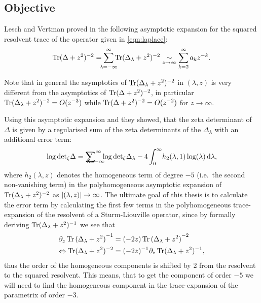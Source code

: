 \subsection{Objective}
Lesch and Vertman proved in \cite{LV13} the following asymptotic expansion for
the squared resolvent trace of the operator given in \cref{eqn:laplace}:
\begin{align}
  \Tr(\Delta + z^2)^{-2} = \sum_{\mathclap{\lambda=-\infty}}^\infty
  \Tr(\Delta_\lambda + z^2)^{-2} \SimAs{z\to\infty} \sum_{k=2}^{\infty}
  a_kz^{-k}.
\end{align}
\begin{Remark}
  Note that in general the asymptotics of $\operatorname{Tr}(\Delta_\lambda + z^2)^{-2}$ in
  $(\lambda,z)$ is very different from the asymptotics of $\operatorname{Tr}(\Delta +
  z^2)^{-2}$, in particular $\operatorname{Tr}(\Delta_\lambda+z^2)^{-2} = O(z^{-3})$ while
  $\operatorname{Tr}(\Delta + z^2)^{-2} = O(z^{-2})$ for $z\to\infty$.
\end{Remark}
Using this asymptotic expansion and  they showed, that the
zeta determinant of $\Delta$ is given by a regularised sum of the
zeta determinants of the $\Delta_\lambda$ with an additional error term:
\begin{align}
  \label{eqn:central-thm}
  \log\zdet\Delta = \Regsum_{\mathclap{\lambda=-\infty}}^\infty
  \log\zdet\Delta_\lambda -
  4\Integ[\infty]{0}{\lambda}{h_2(\lambda, 1)\log(\lambda)},
\end{align}
where $h_2(\lambda, z)$ denotes the homogeneous term of degree $-5$ (i.e.\ the
second non-vanishing term) in the polyhomogeneous asymptotic expansion of
$\operatorname{Tr}(\Delta_\lambda + z^2)^{-2}$ as $\left|(\lambda, z)\right|\to\infty$. The ultimate
goal of this thesis is to calculate the error term by calculating the first few
terms in the polyhomogeneous trace-expansion of the resolvent of a
Sturm-Liouville operator, since by formally deriving $\operatorname{Tr}(\Delta_\lambda +
z^2)^{-1}$ we see that
\begin{align}
  \label{frm:shift}
  \partial_z \operatorname{Tr}{(\Delta_\lambda + z^2)}^{-1} &=
        (-2z) \operatorname{Tr}{(\Delta_\lambda + z^2)}^{-2} \\
        \Leftrightarrow \operatorname{Tr}(\Delta_\lambda + z^2)^{-2} &=
        (-2z)^{-1}\partial_z\operatorname{Tr}(\Delta_\lambda + z^2)^{-1},
\end{align}
thus the order of the homogeneous components is shifted by 2 from the resolvent
to the squared resolvent. This means, that to get the component of order $-5$ we
will need to find the homogeneous component in the trace-expansion of the
parametrix of order $-3$.
